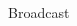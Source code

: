 \begin{frame}[fragile]{Broadcast}
\begin{multicols}{2}
\begin{figure}[H]
    
                
                
        \end{figure}


\end{multicols}
\end{frame}
